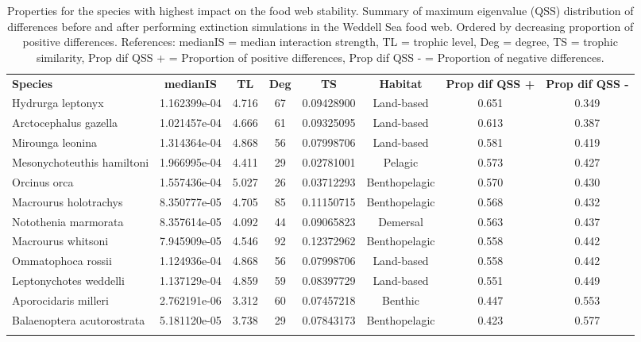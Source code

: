 \documentclass[gc, manuscript]{copernicus}
\begin{document}
\clearpage

\begin{table}[t]
\caption{Properties for the species with highest impact on the food web stability. Summary of maximum eigenvalue (QSS) distribution of differences before and after performing extinction simulations in the Weddell Sea food web. Ordered by decreasing proportion of positive differences. References: medianIS = median interaction strength, TL = trophic level, Deg = degree, TS = trophic similarity, Prop dif QSS + = Proportion of positive differences, Prop dif QSS - = Proportion of negative differences.}
\begin{tabular}{l c c c c c c c}
\tophline

\textbf{Species} & \textbf{medianIS} & \textbf{TL} & \textbf{Deg} & \textbf{TS} & \textbf{Habitat} & \textbf{Prop dif QSS +} & \textbf{Prop dif QSS -} \\
\middlehline
Hydrurga leptonyx & 1.162399e-04 & 4.716 & 67 & 0.09428900 & Land-based & 0.651 & 0.349 \\
\middlehline
Arctocephalus gazella & 1.021457e-04 & 4.666 & 61 & 0.09325095 & Land-based & 0.613 & 0.387 \\
\middlehline
Mirounga leonina & 1.314364e-04 & 4.868 & 56 & 0.07998706 & Land-based & 0.581 & 0.419 \\
\middlehline
Mesonychoteuthis hamiltoni & 1.966995e-04 & 4.411 & 29 & 0.02781001 & Pelagic & 0.573 & 0.427 \\
\middlehline
Orcinus orca & 1.557436e-04 & 5.027 & 26 & 0.03712293 & Benthopelagic & 0.570 & 0.430 \\
\middlehline
Macrourus holotrachys & 8.350777e-05 & 4.705 & 85 & 0.11150715 & Benthopelagic & 0.568 & 0.432 \\
\middlehline
Notothenia marmorata & 8.357614e-05 & 4.092 & 44 & 0.09065823 & Demersal & 0.563 & 0.437 \\
\middlehline
Macrourus whitsoni & 7.945909e-05 & 4.546 & 92 & 0.12372962 & Benthopelagic & 0.558 & 0.442 \\
\middlehline
Ommatophoca rossii & 1.124936e-04 & 4.868 & 56 & 0.07998706 & Land-based & 0.558 & 0.442 \\
\middlehline
Leptonychotes weddelli & 1.137129e-04 & 4.859 & 59 & 0.08397729 & Land-based & 0.551 & 0.449 \\
\middlehline
Aporocidaris milleri & 2.762191e-06 & 3.312 & 60 & 0.07457218 & Benthic & 0.447 & 0.553 \\
\middlehline
Balaenoptera acutorostrata & 5.181120e-05 & 3.738 & 29 & 0.07843173 & Benthopelagic & 0.423 & 0.577 \\
\bottomhline
\end{tabular}
\end{table} 
\end{document}
